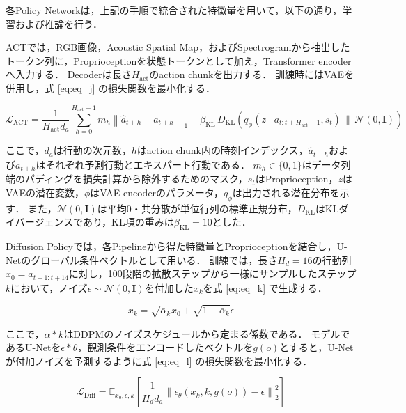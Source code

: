 \documentclass{article}
\begin{document}
	各Policy Networkは，上記の手順で統合された特徴量を用いて，以下の通り，学習および推論を行う．

	ACTでは，RGB画像，Acoustic Spatial Map，およびSpectrogramから抽出したトークン列に，Proprioceptionを状態トークンとして加え，Transformer encoderへ入力する．
	Decoderは長さ$H_{\mathrm{act}}$のaction chunkを出力する．
	訓練時にはVAEを併用し，式 \ref{eq:eq_j} の損失関数を最小化する．

	\begin{equation}
	\label{eq:eq_j}
	\mathcal{L}_{\mathrm{ACT}} = \frac{1}{H_{\mathrm{act}} d_a}\sum_{h=0}^{H_{\mathrm{act}}-1} m_h\left\|\hat{a}_{t+h}-a_{t+h}\right\|_1 + \beta_{\mathrm{KL}}\, D_{\mathrm{KL}}\left(q_\phi(z\mid a_{t:t+H_{\mathrm{act}}-1},s_t)\,\|\,\mathcal{N}(0,\mathbf{I})\right)
	\end{equation}

	ここで，$d_a$は行動の次元数，$h$はaction chunk内の時刻インデックス，$\hat{a}_{t+h}$および$a_{t+h}$はそれぞれ予測行動とエキスパート行動である．
	$m_h\in\{0,1\}$はデータ列端のパディングを損失計算から除外するためのマスク，$s_t$はProprioception，$z$はVAEの潜在変数，$\phi$はVAE encoderのパラメータ，$q_\phi$は出力される潜在分布を示す．
	また，$\mathcal{N}(0,\mathbf{I})$は平均$0$・共分散が単位行列の標準正規分布，$D_{\mathrm{KL}}$はKLダイバージェンスであり，KL項の重みは$\beta_{\mathrm{KL}}=10$とした．

	Diffusion Policyでは，各Pipelineから得た特徴量とProprioceptionを結合し，U-Netのグローバル条件ベクトルとして用いる．
	訓練では，長さ$H_d=16$の行動列$x_0=a_{t-1:t+14}$に対し，100段階の拡散ステップから一様にサンプルしたステップ$k$において，ノイズ$\epsilon\sim\mathcal{N}(0,\mathbf{I})$を付加した$x_k$を式 \ref{eq:eq_k} で生成する．

	\begin{equation}
	\label{eq:eq_k}
	x_k=\sqrt{\bar{\alpha}_k}x_0+\sqrt{1-\bar{\alpha}_k}\epsilon
	\end{equation}

	ここで，$\bar{\alpha}*k$はDDPMのノイズスケジュールから定まる係数である．
	モデルであるU-Netを$\epsilon*\theta$，観測条件をエンコードしたベクトルを$g(o)$とすると，U-Netが付加ノイズを予測するように式 \ref{eq:eq_l} の損失関数を最小化する．

	\begin{equation}
	\label{eq:eq_l}
	\mathcal{L}_{\mathrm{Diff}} =\mathbb{E}_{x_0,\epsilon,k} \left[\frac{1}{H_d d_a}\left\|\epsilon_\theta(x_k,k,g(o))-\epsilon\right\|_2^2\right]
	\end{equation}
\end{document}
